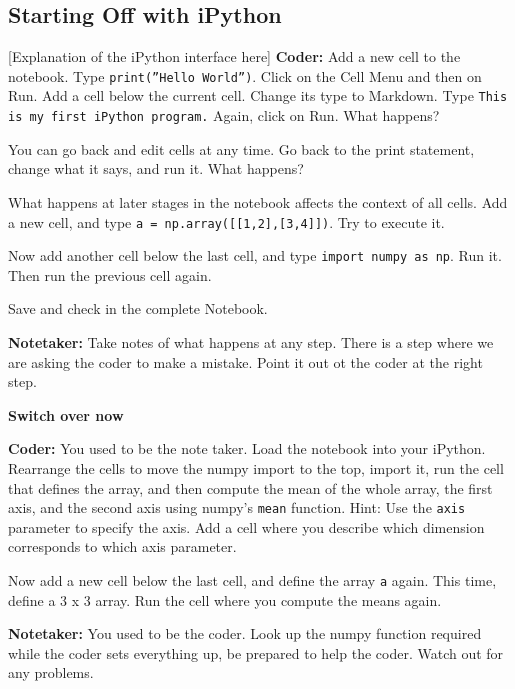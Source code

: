 \documentclass[11pt,a4paper]{article}
\begin{document}
\subsection*{Starting Off with iPython}

[Explanation of the iPython interface here]
\textbf{Coder:}
Add a new cell to the notebook. Type \texttt{print(''Hello World'')}. Click on the Cell Menu and then on Run. 
Add a cell below the current cell. Change its type to Markdown. Type \texttt{This is my first iPython program.} Again, click on Run. What happens? 

You can go back and edit cells at any time. Go back to the print statement, change what it says, and run it. What happens?

What happens at later stages in the notebook affects the context of all cells. Add a new cell, and type \texttt{a = np.array([[1,2],[3,4]])}. Try to execute it.

Now add another cell below the last cell, and type \texttt{import numpy as np}. Run it. Then run the previous cell again. 

Save and check in the complete Notebook. 

\textbf{Notetaker:} Take notes of what happens at any step. There is a step where we are asking the coder to make a mistake. Point it out ot the coder at the right step. 

\textbf{Switch over now}

\textbf{Coder:} You used to be the note taker. Load the notebook into your iPython. Rearrange the cells to move the numpy import to the top, import it, run the cell that defines the array, and then compute the mean of the whole array, the first axis, and the second axis using numpy's \texttt{mean} function. Hint: Use the \texttt{axis} parameter to specify the axis. Add a cell where you describe which dimension corresponds to which axis parameter. 

Now add a new cell below the last cell, and define the array \texttt{a} again. This time, define a 3 x 3 array. Run the cell where you compute the means again. 

\textbf{Notetaker:} You used to be the coder. Look up the numpy function required while the coder sets everything up, be prepared to help the coder. Watch out for any problems.
\end{document}
